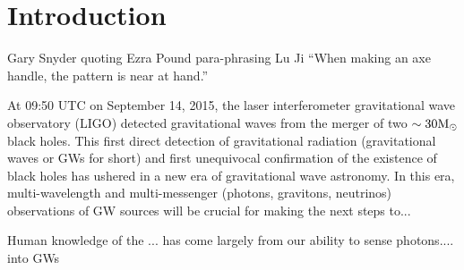 \chapter[Introduction]{Introduction} \label{ch:intro}







\vspace{-16pt} \begin{chapquote}{Gary Snyder quoting Ezra Pound para-phrasing Lu Ji} \singlespacing ``When making an axe handle, the pattern is near at hand.'' 
 \end{chapquote} \vspace{-8pt}
\noindent\makebox[\linewidth]{\rule{0.5\textwidth}{0.5pt}} \vspace{1pt}


	

At 09:50 UTC on September 14, 2015, the laser interferometer gravitational wave observatory (LIGO) detected gravitational waves from the merger of two $\sim 30 \mathrm{M}_\odot$ black holes. This first direct detection of gravitational radiation (gravitational waves or GWs for short) and first unequivocal confirmation of the existence of black holes has ushered in a new era of gravitational wave astronomy. In this era, multi-wavelength and multi-messenger (photons, gravitons, neutrinos) observations of GW sources will be crucial for making the next steps to...

Human knowledge of the ... has come largely from our ability to sense photons.... into GWs

